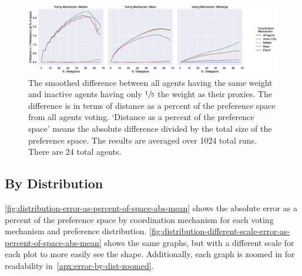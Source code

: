 \begin{landscape}
    \begin{figure}[p]
        \centering
        \includegraphics[scale=0.55]
        {content/chapter2/figures/different_weight/difference_abs_pref_percent_of_space_smoothed}
        \caption{
            The smoothed difference between all agents having the same weight and
            inactive agents having only $\sfrac{1}{5}$ the weight as their proxies.
            The difference is in terms of distance as a percent of the preference
            space from all agents voting.
            `Distance as a percent of the preference space' means the absolute
            difference divided by the total size of the preference space.
            The results are averaged over 1024 total runs.
            There are 24 total agents.
        }
        \label{fig:different-weight-comparison}
    \end{figure}
\end{landscape}

\subsection{By Distribution}\label{subsec:results-distribution}
\autoref{fig:distribution-error-as-percent-of-space-abs-mean} shows
the absolute error as a percent of the preference space by coordination mechanism for
each voting mechanism and preference distribution.
\autoref{fig:distribution-different-scale-error-as-percent-of-space-abs-mean} shows
the same graphs, but with a different scale for each plot to more easily see the shape.
Additionally, each graph is zoomed in for readability
in~\autoref{apx:error-by-dist-zoomed}.

